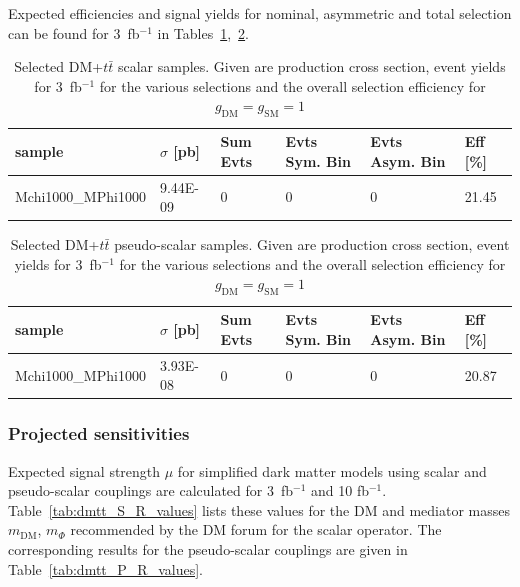 Expected efficiencies and signal yields for nominal, asymmetric and total selection can be found for 3~fb$^{-1}$ in Tables~\ref{tab:dmtt_S},~\ref{tab:dmtt_P}.

\begin{table}[h!]
\small
\centering
\begin{tabular}{l|lllll}
\hline
sample             & $\sigma$ [pb] & Sum Evts       & Evts Sym. Bin & Evts Asym. Bin & Eff  [\%]   \\\hline
Mchi1000\_MPhi1000 & 9.44E-09 & 0      & 0      & 0     & 21.45 \\
\hline
\end{tabular}
\caption{Selected DM+$t\bar{t}$ scalar samples. Given are production cross section, event yields for 3~fb$^{-1 }$ for the various selections and the overall selection efficiency for $g_\textrm{DM}=g_\textrm{SM}=1$ \label{tab:dmtt_S}}
\end{table}

\begin{table}[h!]
\small
\centering
\begin{tabular}{l|lllll}
\hline
sample             & $\sigma$ [pb] & Sum Evts       & Evts Sym. Bin & Evts Asym. Bin & Eff  [\%]   \\\hline
Mchi1000\_MPhi1000 & 3.93E-08 & 0     & 0     & 0     & 20.87 \\
\hline
\end{tabular}
\caption{Selected DM+$t\bar{t}$ pseudo-scalar samples. Given are production cross section, event yields for 3~fb$^{-1 }$ for the various selections and the overall selection efficiency for $g_\textrm{DM}=g_\textrm{SM}=1$ \label{tab:dmtt_P}}
\end{table}

\clearpage
\subsubsection{Projected sensitivities}

Expected signal strength $\mu$ for simplified dark matter models using scalar and pseudo-scalar couplings are calculated for 3~fb$^{-1 }$ and 10 fb$^{-1 }$. Table~\ref{tab:dmtt_S_R_values} lists these
values for the DM and mediator masses $m_\textrm{DM}$, $m_\Phi$ recommended by the DM forum for the scalar operator. The corresponding results for the pseudo-scalar couplings are given in Table~\ref{tab:dmtt_P_R_values}. 


